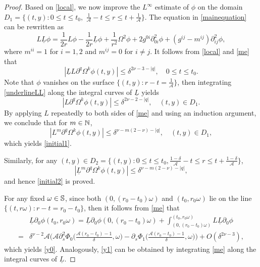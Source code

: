\documentclass[11pt,twoside]{article}
\begin{document}
\begin{proof}
Based on \eqref{local}, we now improve the $L^\infty$ estimate of $\phi$ on the domain $D_1=\{(t,y): 0\le t \le t_0,$
$\frac{1}{\mathcal A} - t\le r \le t+\frac{ 1}{\mathcal A}\}$.
The equation in \eqref{mainequation} can be rewritten as
\begin{equation}\label{me}
L\underline{L}\phi
= \frac{1}{2r}L\phi
- \frac{1}{2r}\underline{L}\phi
+ \frac{1}{r^2}\Omega^2\phi
+ 2g^{0i}\partial_{0i}^2\phi
+ (g^{ij}-m^{ij})\partial_{ij}^2\phi,
\end{equation}
where $m^{ii} = 1$ for $i=1, 2$ and $m^{ij} = 0$ for $i\neq j$.
It follows from \eqref{local} and \eqref{me} that
\begin{equation}\label{underlineLL}
|\underline{L}L\partial^q\Omega^k\phi(t,y)|
\le \delta^{2\nu-3-|q|},
\quad 0 \le t \le t_0.
\end{equation}
Note that $\phi$ vanishes on the surface $\{(t,y) : r- t = \frac{1}{\mathcal A}\}$, then integrating \eqref{underlineLL} along
the integral curves of $\underline{L}$ yields
\begin{equation}\label{YHCC4}
|L\partial^q\Omega^k\phi(t,y)|
\le \delta^{2\nu-2-|q|},
\quad (t,y) \in D_1.
\end{equation}
By applying $L$ repeatedly to both sides of \eqref{me} and using an induction argument,
we conclude that for $m\in\Bbb N$,
\[
|L^m\partial^q\Omega^k\phi(t,y)|
\le \delta^{\nu-m(2-\nu)-|q|},
\quad (t,y) \in D_1,
\]
which yields \eqref{initial1}.


Similarly, for any $(t,y) \in D_2=\{(t,y): 0\le t \le t_0,
\frac{1-\delta}{\mathcal A} - t \le r \le t+\frac{ 1-\delta}{\mathcal A}\}$,
\[
|\underline L^m\partial^q\Omega^k\phi(t,y)|
\le \delta^{\nu-m(2-\nu)-|q|},
\]
and hence \eqref{initial2} is proved.

For any fixed $\omega\in\Bbb S$, since both $(0,(r_0-t_0)\omega)$ and $(t_0, r_0\omega)$ lie on the line $\{(t,r\omega): r-t=r_0-t_0\}$,
then it follows from \eqref{me} that
\begin{equation}\label{YHCCC-3}
\begin{split}
&\underline{L}\partial_{0}\phi(t_0,r_0\omega)
=\underline{L}\partial_{0}\phi(0,(r_0-t_0)\omega)+\int_{(0,(r_0-t_0)\omega)}^{(t_0,r_0\omega)}L\underline{L}\partial_{0}\phi\\
=&\delta^{\nu-2}\mathcal{A}\big(\mathcal{A}\partial_s^2\Phi_0\big(\frac{\mathcal{A}(r_0-t_0)-1}{\delta}, \omega\big)-\partial_s\Phi_1\big(\frac{\mathcal{A}(r_0-t_0)-1}{\delta}, \omega\big)\big)+O(\delta^{2\nu-3}),
\end{split}
\end{equation}
which yields \eqref{y0}. Analogously, \eqref{y1} can be obtained
by integrating \eqref{me} along the integral curves of $\underline L$.
\end{proof}
\end{document}
